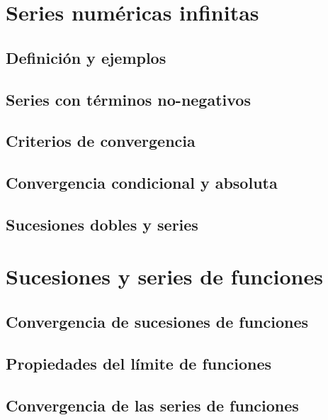 \documentclass[12pt,]{krantz}
\theoremstyle{definition}
\theoremstyle{definition}
\theoremstyle{definition}
\theoremstyle{remark}
\begin{document}
\chapter{Series numéricas infinitas}\label{series-numericas-infinitas}

\section{Definición y ejemplos}\label{definicion-y-ejemplos-1}

\section{Series con términos
no-negativos}\label{series-con-terminos-no-negativos}

\section{Criterios de convergencia}\label{criterios-de-convergencia}

\section{Convergencia condicional y
absoluta}\label{convergencia-condicional-y-absoluta}

\section{Sucesiones dobles y series}\label{sucesiones-dobles-y-series}

\chapter{Sucesiones y series de
funciones}\label{sucesiones-y-series-de-funciones}

\section{Convergencia de sucesiones de
funciones}\label{convergencia-de-sucesiones-de-funciones}

\section{Propiedades del límite de
funciones}\label{propiedades-del-limite-de-funciones}

\section{Convergencia de las series de
funciones}\label{convergencia-de-las-series-de-funciones}
\end{document}
